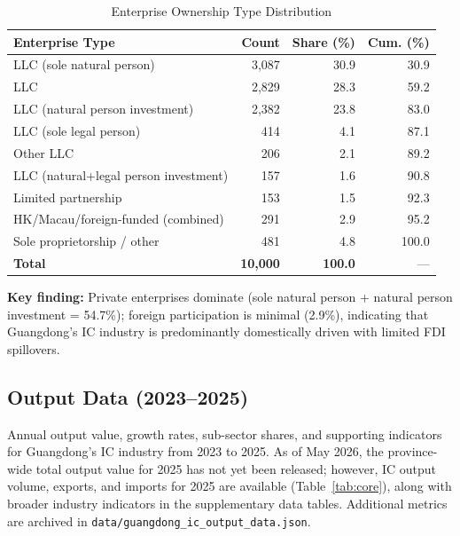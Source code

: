 \documentclass[12pt,a4paper]{article}
\newcommand{\tableHeaderRow}{\rowcolor{tealPrimary}\color{white}}
\newcommand{\tableOddRow}{\rowcolor{mintBG}}
\newcommand{\tableEvenRow}{\rowcolor{white}}
\begin{document}
\begin{table}[H]
\centering
\caption{Enterprise Ownership Type Distribution}
\label{tab:enterprise_type}
\begin{tabular}{lrrr}
\toprule
\tableHeaderRow
\textbf{Enterprise Type} & \textbf{Count} & \textbf{Share (\%)} & \textbf{Cum. (\%)} \\
\midrule
\tableOddRow  LLC (sole natural person)           & 3,087 & 30.9 & 30.9 \\
\tableEvenRow LLC                                  & 2,829 & 28.3 & 59.2 \\
\tableOddRow  LLC (natural person investment)      & 2,382 & 23.8 & 83.0 \\
\tableEvenRow LLC (sole legal person)              & 414   & 4.1  & 87.1 \\
\tableOddRow  Other LLC                            & 206   & 2.1  & 89.2 \\
\tableEvenRow LLC (natural+legal person investment) & 157  & 1.6  & 90.8 \\
\tableOddRow  Limited partnership                  & 153   & 1.5  & 92.3 \\
\tableEvenRow HK/Macau/foreign-funded (combined)   & 291   & 2.9  & 95.2 \\
\tableOddRow  Sole proprietorship / other          & 481   & 4.8  & 100.0 \\
\midrule
\tableEvenRow \textbf{Total} & \textbf{10,000} & \textbf{100.0} & --- \\
\bottomrule
\end{tabular}
\end{table}


\textbf{Key finding:} Private enterprises dominate (sole natural person + natural person
investment = 54.7\%); foreign participation is minimal (2.9\%), indicating that
Guangdong's IC industry is predominantly domestically driven with limited FDI spillovers.


\subsection{Output Data (2023--2025)}
\label{sec:output}

Annual output value, growth rates, sub-sector shares, and supporting
indicators for Guangdong's IC industry from 2023 to 2025. As of
May 2026, the province-wide total output value for 2025 has not yet
been released; however, IC output volume, exports, and imports for
2025 are available (Table~\ref{tab:core}), along with broader
industry indicators in the supplementary data tables. Additional
metrics are archived in \texttt{data/guangdong\_ic\_output\_data.json}.
\end{document}
